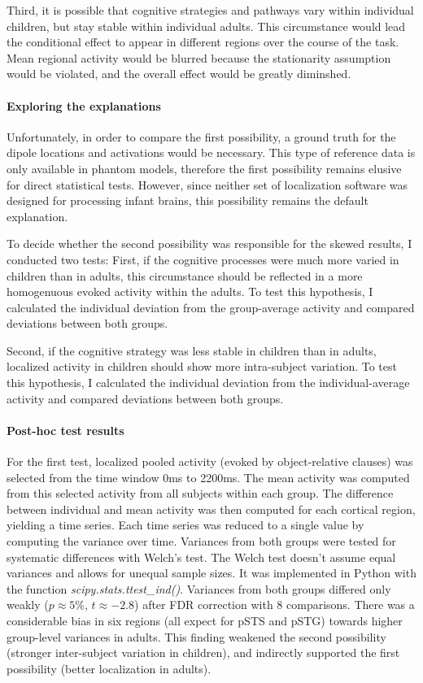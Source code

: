 Third, it is possible that cognitive strategies and pathways vary within individual children, but stay stable within individual adults.
This circumstance would lead the conditional effect to appear in different regions over the course of the task.
Mean regional activity would be blurred because the stationarity assumption would be violated, and the overall effect would be greatly diminshed.

\paragraph{Exploring the explanations}
Unfortunately, in order to compare the first possibility, a ground truth for the dipole locations and activations would be necessary.
This type of reference data is only available in phantom models, therefore the first possibility remains elusive for direct statistical tests.
However, since neither set of localization software was designed for processing infant brains, this possibility remains the default explanation.

To decide whether the second possibility was responsible for the skewed results, I conducted two tests:
First, if the cognitive processes were much more varied in children than in adults, this circumstance should be reflected in a more homogenuous evoked activity within the adults.
To test this hypothesis, I calculated the individual deviation from the group-average activity and compared deviations between both groups.

Second, if the cognitive strategy was less stable in children than in adults, localized activity in children should show more intra-subject variation.
To test this hypothesis, I calculated the individual deviation from the individual-average activity and compared deviations between both groups.

\paragraph{Post-hoc test results}
For the first test, localized pooled activity (evoked by object-relative clauses) was selected from the time window 0ms to 2200ms.
The mean activity was computed from this selected activity from all subjects within each group.
The difference between individual and mean activity was then computed for each cortical region, yielding a time series.
Each time series was reduced to a single value by computing the variance over time.
Variances from both groups were tested for systematic differences with Welch's test.
The Welch test doesn't assume equal variances and allows for unequal sample sizes.
It was implemented in Python with the function \emph{scipy.stats.ttest\_ind()}.
Variances from both groups differed only weakly ($p \approx 5\%$, $t \approx -2.8$) after FDR correction with 8 comparisons.
There was a considerable bias in six regions (all expect for pSTS and pSTG) towards higher group-level variances in adults.
This finding weakened the second possibility (stronger inter-subject variation in children), and indirectly supported the first possibility (better localization in adults).

